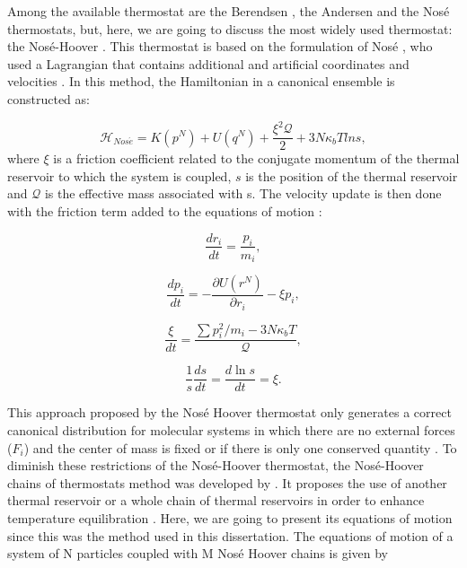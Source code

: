 Among the available thermostat are the Berendsen \cite{doi:10.1063/1.448118}, the Andersen \cite{1980JChPh722384A} and the Nos\'{e} \cite{1984JChPh81511N} thermostats, but, here, we are going to discuss the most widely used thermostat: the Nosé-Hoover \cite{PhysRevA.31.1695}. This thermostat is based on the formulation of Nosé \cite{1984JChPh81511N}, who used a Lagrangian that contains additional and artificial coordinates and velocities \cite{frenkel}. In this method, the Hamiltonian in a canonical ensemble is constructed as:

\begin{equation}
\mathcal{H}_{Nos\acute{e}} =  K(p^{N}) + U(q^{N})  + \frac{\xi ^{2} \mathcal{Q}}{2} + 3N\kappa_{b}T ln s ,
\end{equation}
where $\xi$ is a friction coefficient related to the conjugate momentum of the thermal reservoir to which the system is coupled, $s$ is the position of the thermal reservoir and $\mathcal{Q}$ is the effective mass associated with s. The velocity update is then done with the friction term added to the equations of motion \cite{shell2015}:

\begin{equation}
\frac{dr_{i}}{dt} = \frac{p_i}{m_i},
\end{equation}

\begin{equation}
\frac{dp_{i}}{dt} = -  \frac{\partial U (r^{N})}{\partial r_{i}} - \xi p_{i},
\end{equation}

\begin{equation}
\frac{\xi}{dt} = \frac{\sum p_{i}^{2}/m_{i} - 3N\kappa_{b}T}{\mathcal{Q}} ,
\end{equation}

\begin{equation}
\frac{1}{s}\frac{ds}{dt} =\frac{d \ln s}{dt} = \xi.
\end{equation}

This approach proposed by the Nos\'{e} Hoover thermostat only generates a correct canonical distribution for molecular systems in which there are no external forces ($F_{i}$) and the center of mass is fixed or if there is only one conserved quantity \cite{frenkel}. To diminish these restrictions of the Nosé-Hoover thermostat, the Nosé-Hoover chains of thermostats method was developed by . It proposes the use of another thermal reservoir or a whole chain of thermal reservoirs in order to enhance temperature equilibration \cite{shell2015}. Here, we are going to present its equations of motion since this was the method used in this dissertation. The equations of motion of a system of N particles coupled with M Nos\'{e} Hoover chains is given by

